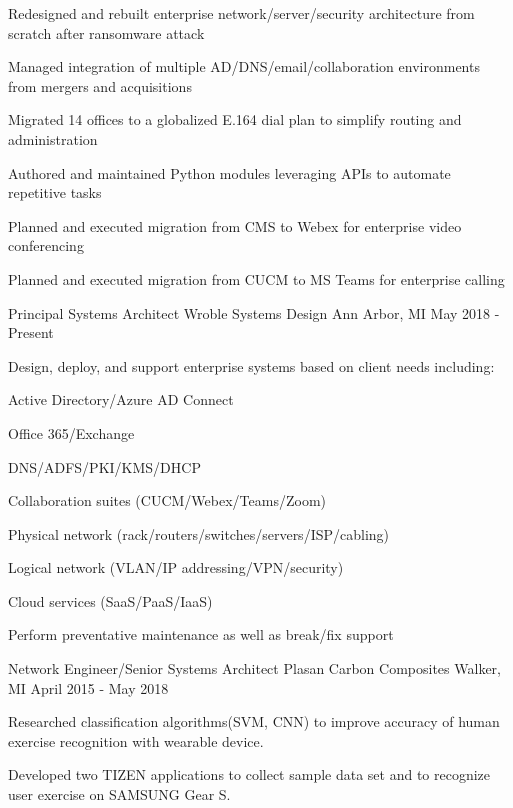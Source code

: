\begin{cventries}
{\begin{cvitems}
        \item {Redesigned and rebuilt enterprise network/server/security architecture from scratch after ransomware attack}
        \item {Managed integration of multiple AD/DNS/email/collaboration environments from mergers and acquisitions}
        \item {Migrated 14 offices to a globalized E.164 dial plan to simplify routing and administration}
        \item {Authored and maintained Python modules leveraging APIs to automate repetitive tasks}
        \item {Planned and executed migration from CMS to Webex for enterprise video conferencing}
        \item {Planned and executed migration from CUCM to MS Teams for enterprise calling}
      \end{cvitems}
    }

  \cventry
    {Principal Systems Architect} %
    {Wroble Systems Design} %
    {Ann Arbor, MI} %
    {May 2018 - Present} %
    {
      \begin{cvitems} %
        \item {Design, deploy, and support enterprise systems based on client needs including:}
        \begin{cvsubitems} %
          \item {Active Directory/Azure AD Connect}
          \item {Office 365/Exchange}
          \item {DNS/ADFS/PKI/KMS/DHCP}
          \item {Collaboration suites (CUCM/Webex/Teams/Zoom)}
          \item {Physical network (rack/routers/switches/servers/ISP/cabling)}
          \item {Logical network (VLAN/IP addressing/VPN/security)}
          \item {Cloud services (SaaS/PaaS/IaaS)}
        \end{cvsubitems}
        \item {Perform preventative maintenance as well as break/fix support}
      \end{cvitems}
    }

  \cventry
    {Network Engineer/Senior Systems Architect} %
    {Plasan Carbon Composites} %
    {Walker, MI} %
    {April 2015 - May 2018} %
    {
      \begin{cvitems} %
        \item {Researched classification algorithms(SVM, CNN) to improve accuracy of human exercise recognition with wearable device.}
        \item {Developed two TIZEN applications to collect sample data set and to recognize user exercise on SAMSUNG Gear S.}
      \end{cvitems}
    }


\end{cventries}
